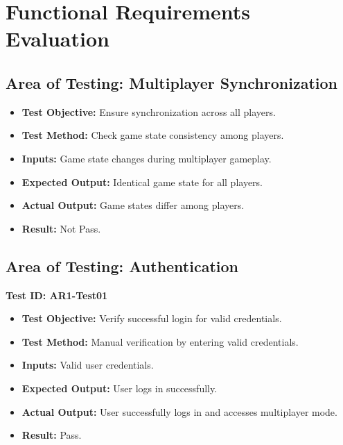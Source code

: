 \documentclass[12pt, titlepage]{article}
\begin{document}
\newpage

\tableofcontents

\listoftables %

\listoffigures %

\newpage


\section{Functional Requirements Evaluation}

\subsection{Area of Testing: Multiplayer Synchronization}
\begin{itemize}
    \item \textbf{Test Objective:} Ensure synchronization across all players.
    \item \textbf{Test Method:} Check game state consistency among players.
    \item \textbf{Inputs:} Game state changes during multiplayer gameplay.
    \item \textbf{Expected Output:} Identical game state for all players.
    \item \textbf{Actual Output:} Game states differ among players.
    \item \textbf{Result:} Not Pass.
\end{itemize}

\subsection{Area of Testing: Authentication}

\textbf{Test ID: AR1-Test01}
\begin{itemize}
    \item \textbf{Test Objective:} Verify successful login for valid credentials.
    \item \textbf{Test Method:} Manual verification by entering valid credentials.
    \item \textbf{Inputs:} Valid user credentials.
    \item \textbf{Expected Output:} User logs in successfully.
    \item \textbf{Actual Output:} User successfully logs in and accesses multiplayer mode.
    \item \textbf{Result:} Pass.
\end{itemize}
\end{document}

